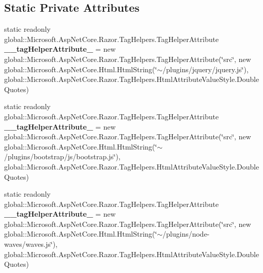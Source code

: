 \subsection*{Static Private Attributes}
\begin{DoxyCompactItemize}
\item 
\mbox{\label{class_asp_net_core_1_1_views___shared____footer_abbb413c2819019ca1b2743db98a802bc}} 
static readonly global\+::\+Microsoft.\+Asp\+Net\+Core.\+Razor.\+Tag\+Helpers.\+Tag\+Helper\+Attribute {\bfseries \+\_\+\+\_\+tag\+Helper\+Attribute\+\_} = new global\+::\+Microsoft.\+Asp\+Net\+Core.\+Razor.\+Tag\+Helpers.\+Tag\+Helper\+Attribute(\char`\"{}src\char`\"{}, new global\+::\+Microsoft.\+Asp\+Net\+Core.\+Html.\+Html\+String(\char`\"{}$\sim$/plugins/jquery/jquery.\+js\char`\"{}), global\+::\+Microsoft.\+Asp\+Net\+Core.\+Razor.\+Tag\+Helpers.\+Html\+Attribute\+Value\+Style.\+Double\+Quotes)
\item 
\mbox{\label{class_asp_net_core_1_1_views___shared____footer_a34434457d58fdf185b0b3b99ddf5fc76}} 
static readonly global\+::\+Microsoft.\+Asp\+Net\+Core.\+Razor.\+Tag\+Helpers.\+Tag\+Helper\+Attribute {\bfseries \+\_\+\+\_\+tag\+Helper\+Attribute\+\_} = new global\+::\+Microsoft.\+Asp\+Net\+Core.\+Razor.\+Tag\+Helpers.\+Tag\+Helper\+Attribute(\char`\"{}src\char`\"{}, new global\+::\+Microsoft.\+Asp\+Net\+Core.\+Html.\+Html\+String(\char`\"{}$\sim$/plugins/bootstrap/js/bootstrap.\+js\char`\"{}), global\+::\+Microsoft.\+Asp\+Net\+Core.\+Razor.\+Tag\+Helpers.\+Html\+Attribute\+Value\+Style.\+Double\+Quotes)
\item 
\mbox{\label{class_asp_net_core_1_1_views___shared____footer_a8f10f70744449ffb574fda578e978636}} 
static readonly global\+::\+Microsoft.\+Asp\+Net\+Core.\+Razor.\+Tag\+Helpers.\+Tag\+Helper\+Attribute {\bfseries \+\_\+\+\_\+tag\+Helper\+Attribute\+\_} = new global\+::\+Microsoft.\+Asp\+Net\+Core.\+Razor.\+Tag\+Helpers.\+Tag\+Helper\+Attribute(\char`\"{}src\char`\"{}, new global\+::\+Microsoft.\+Asp\+Net\+Core.\+Html.\+Html\+String(\char`\"{}$\sim$/plugins/node-\/waves/waves.\+js\char`\"{}), global\+::\+Microsoft.\+Asp\+Net\+Core.\+Razor.\+Tag\+Helpers.\+Html\+Attribute\+Value\+Style.\+Double\+Quotes)
\item 
\mbox{\label{class_asp_net_core_1_1_views___shared____footer_a287370e27a36d7fd33d114616bdfd44e}} 

\end{DoxyCompactItemize}
